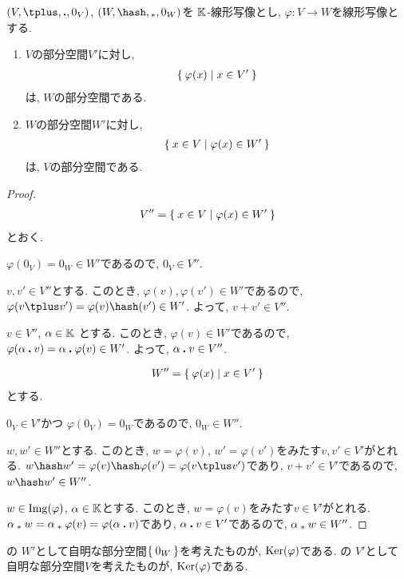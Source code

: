 \begin{prop}
  \label{subspace:prop:img:inverseimage}
  $(V,\plus,\act,0_V)$,
  $(W,\pplus,\aact,0_W)$を
  $\mathbb{K}$-線形写像とし,
  $\varphi\colon V\to W$を線形写像とする.
  \begin{enumerate}
  \item
    $V$の部分空間$V'$に対し,
    \begin{align*}
      \Set{\varphi(x)|x\in V'}
    \end{align*}
    は, $W$の部分空間である.
  \item
    $W$の部分空間$W'$に対し,
    \begin{align*}
      \Set{x\in V|\varphi(x)\in W'}
    \end{align*}
    は, $V$の部分空間である.
  \end{enumerate}
\end{prop}
\begin{proof}
    \begin{align*}
      V''=\Set{x\in V|\varphi(x)\in W'}
    \end{align*}
とおく.

$\varphi(0_V)=0_W\in W'$であるので,
$0_V\in V''$.

$v,v'\in V''$とする.
このとき,
$\varphi(v),\varphi(v')\in W'$であるので,
$\varphi(v\plus v')=\varphi(v)\pplus (v')\in W'$.
よって, $v\plus v'\in V''$.

$v\in V''$,
$\alpha\in \mathbb{K}$
とする.
このとき,
$\varphi(v)\in W'$であるので,
$\varphi(\alpha\mathbin{\boldsymbol{.}} v)=\alpha\mathbin{\boldsymbol{.}} \varphi(v)\in W'$.
よって, $\alpha\mathbin{\boldsymbol{.}} v\in V''$.

    \begin{align*}
      W''=\Set{\varphi(x)|x\in V'}
    \end{align*}
とする.

$0_V\in V'$かつ
$\varphi(0_V)=0_W$であるので,
$0_W\in W''$.

$w,w'\in W''$とする.
このとき,
$w=\varphi(v)$, $w'=\varphi(v')$をみたす$v, v'\in V'$がとれる.
$w\pplus w'=\varphi(v)\pplus\varphi(v')=\varphi(v\plus v')$であり,
$v\plus v'\in V'$であるので,
$w\pplus w'\in W''$.

$w\in \operatorname{Img}(\varphi)$,
$\alpha\in\mathbb{K}$とする.
このとき,
$w=\varphi(v)$をみたす$v\in V'$がとれる.
$\alpha\mathbin{{}_\ast} w=\alpha\mathbin{{}_\ast}\varphi(v)=\varphi(\alpha\mathbin{\boldsymbol{.}} v)$であり,
$\alpha\mathbin{\boldsymbol{.}} v\in V'$であるので,
$\alpha\mathbin{{}_\ast} w\in W''$.
\end{proof}

\begin{remark}
  の
  $W'$として自明な部分空間$\Set{0_W}$を考えたものが,
  $\operatorname{Ker}(\varphi)$である.
  の
  $V'$として自明な部分空間$V$を考えたものが,
  $\operatorname{Ker}(\varphi)$である.
\end{remark}

